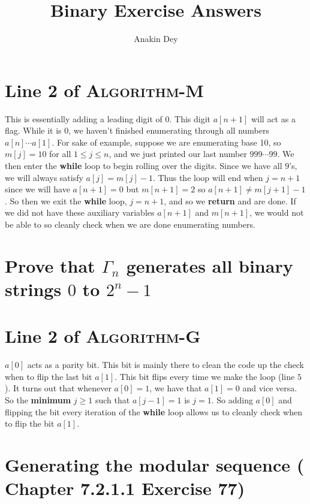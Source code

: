 \documentclass[letterpaper]{article}
\title{Binary Exercise Answers}
\author{Anakin Dey}
\begin{document}
\maketitle

\section*{Line 2 of \textsc{Algorithm-M}}

This is essentially adding a leading digit of 0. This digit $a[n + 1]$ will act as a flag. While it is $0$, we haven't finished enumerating through all numbers $a[n] \cdots a[1]$. For sake of example, suppose we are enumerating base 10, so $m[j] = 10$ for all $1 \leq j \leq n$, and we just printed our last number $999 \cdots 99$. We then enter the \textbf{while} loop to begin rolling over the digits. Since we have all $9$'s, we will always satisfy $a[j] = m[j] - 1$. Thus the loop will end when $j = n + 1$ since we will have $a[n + 1] = 0$ but $m[n + 1] = 2$ so $a[n + 1] \neq m[j + 1] - 1$. So then we exit the \textbf{while} loop, $j = n + 1$, and so we \textbf{return} and are done. If we did not have these auxiliary variables $a[n + 1]$ and $m[n + 1]$, we would not be able to so cleanly check when we are done enumerating numbers.

\section*{\boldmath Prove that $\Gamma_n$ generates all binary strings $0$ to $2^{n} - 1$}


\section*{Line 2 of \textsc{Algorithm-G}}

$a[0]$ acts as a parity bit. This bit is mainly there to clean the code up the check when to flip the last bit $a[1]$. This bit flips every time we make the loop (line $5$). It turns out that whenever $a[0] = 1$, we have that $a[1] = 0$ and vice versa. So the \textbf{minimum} $j \geq 1$ such that $a[j - 1] = 1$ is $j = 1$. So adding $a[0]$ and flipping the bit every iteration of the \textbf{while} loop allows us to cleanly check when to flip the bit $a[1]$.

\section{Generating the modular sequence (\cite{TAOCP4A} Chapter 7.2.1.1 Exercise 77)}


\printbibliography
\end{document}
